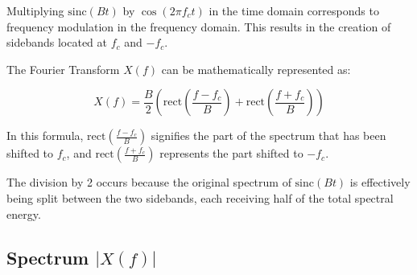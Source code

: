 \documentclass{article}
\begin{document}
Multiplying \( \text{sinc}(Bt) \) by \( \cos(2\pi f_c t) \) in the time domain corresponds to frequency modulation in the frequency domain. This results in the creation of sidebands located at \( f_c \) and \( -f_c \).

The Fourier Transform \( X(f) \) can be mathematically represented as:

\[
X(f) = \frac{B}{2} \left( \text{rect}\left(\frac{f - f_c}{B}\right) + \text{rect}\left(\frac{f + f_c}{B}\right) \right)
\]

In this formula, \( \text{rect}\left(\frac{f - f_c}{B}\right) \) signifies the part of the spectrum that has been shifted to \( f_c \), and \( \text{rect}\left(\frac{f + f_c}{B}\right) \) represents the part shifted to \( -f_c \).

The division by 2 occurs because the original spectrum of \( \text{sinc}(Bt) \) is effectively being split between the two sidebands, each receiving half of the total spectral energy.

\newpage
\subsection*{Spectrum \( |X(f)| \)}
\end{document}
